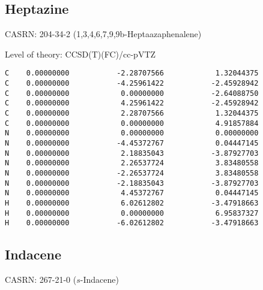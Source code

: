 \documentclass[journal=jctcce,manuscript=article,layout=traditional]{achemso}
\newcommand{\TZ}{cc-pVTZ}
\begin{document}
\subsection{Heptazine}

CASRN: 204-34-2 (1,3,4,6,7,9,9b-Heptaazaphenalene)

\begin{singlespace} 
\noindent  Level of theory: CCSD(T)(FC)/{\TZ}
\begin{verbatim}
C    0.00000000           -2.28707566            1.32044375
C    0.00000000           -4.25961422           -2.45928942
C    0.00000000            0.00000000           -2.64088750
C    0.00000000            4.25961422           -2.45928942
C    0.00000000            2.28707566            1.32044375
C    0.00000000            0.00000000            4.91857884
N    0.00000000            0.00000000            0.00000000
N    0.00000000           -4.45372767            0.04447145
N    0.00000000            2.18835043           -3.87927703
N    0.00000000            2.26537724            3.83480558
N    0.00000000           -2.26537724            3.83480558
N    0.00000000           -2.18835043           -3.87927703
N    0.00000000            4.45372767            0.04447145
H    0.00000000            6.02612802           -3.47918663
H    0.00000000            0.00000000            6.95837327
H    0.00000000           -6.02612802           -3.47918663
\end{verbatim}
\end{singlespace} 

\subsection{Indacene}

CASRN: 267-21-0 ($s$-Indacene)
\end{document}
